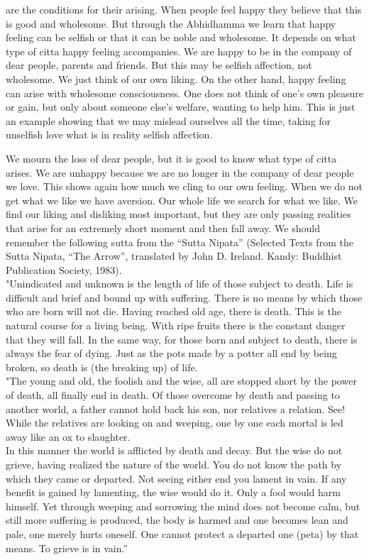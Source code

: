 \documentclass[10pt,a4paper,final]{article}
\begin{document}
are the conditions for their arising.
When people feel happy they believe that
this is good and wholesome. But through the Abhidhamma we learn that
happy feeling can be selfish or that it can be noble and wholesome. It
depends on what type of citta happy feeling accompanies. We are happy to
be in the company of dear people, parents and friends. But this may be
selfish affection, not wholesome. We just think of our own liking. On
the other hand, happy feeling can arise with wholesome consciousness.
One does not think of one's own pleasure or gain, but
only about someone else's
welfare, wanting to help him. This is just an example showing that we
may mislead ourselves all the time, taking for unselfish love what is in
reality selfish affection.~

We mourn the loss of
dear people, but it is good to know what type of citta arises. We are
unhappy because we are no longer in the company of dear
people we
love. This shows again how
much we cling to our own feeling. When we do not get what we like we
have aversion. Our whole life we search for what we like. We
find our liking and
disliking most important, but they are only passing
realities that arise for an extremely short moment and then fall away.
We should remember the following sutta from
the ``Sutta
Nipata'' (Selected Texts from the Sutta Nipata,
``The Arrow'', translated by
John D. Ireland. Kandy:
Buddhist Publication Society, 1983).\\
"Unindicated and unknown is the length
of life of those subject to death. Life
is difficult and brief and bound up with
suffering. There is no means by which
those who are born will not die. Having
reached old age, there is death. This is
the natural course for a living being.
With ripe fruits there is the constant
danger that they will fall. In the same
way, for those born and subject to
death, there is always the fear of
dying. Just as the pots made by a potter all
end by being broken, so death is (the
breaking up) of life.\\
"The young and old, the foolish and the
wise, all are stopped short by the power
of death, all finally end in death. Of
those overcome by death and passing to
another world, a father cannot hold back
his son, nor relatives a relation. See!
While the relatives are looking on and
weeping, one by one each mortal is led
away like an ox to slaughter.\\
In this manner the world is afflicted
by death and decay. But the wise do not
grieve, having realized the nature of
the world. You do not know the path by
which they came or departed. Not seeing
either end you lament in vain. If any
benefit is gained by lamenting, the wise
would do it. Only a fool would harm
himself. Yet through weeping and
sorrowing the mind does not become calm, but
still more suffering is produced, the
body is harmed and one becomes lean and
pale, one merely hurts oneself. One
cannot protect a departed one (peta) by that
means. To grieve is in
vain.''
\end{document}
